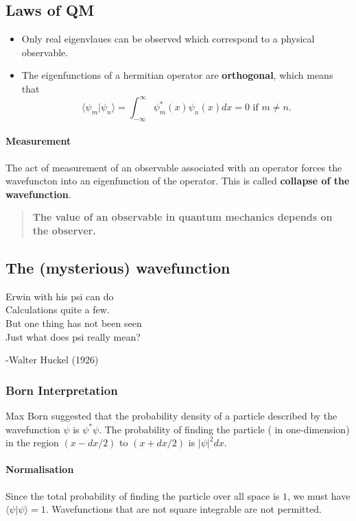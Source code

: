 \documentclass[12pt]{article}
\begin{document}
\subsection*{Laws of QM}
\begin{itemize}
\item Only real eigenvlaues can be observed which correspond to a physical observable.
\item The eigenfunctions of a hermitian operator are \textbf{orthogonal}, which means that \[\langle \psi_m | \psi_n \rangle =\int_{-\infty}^{\infty} \psi_m^*(x) \psi_n(x) dx =0 \textrm{ if } m \neq n.\]

\end{itemize}
\paragraph{Measurement} The act of measurement of an observable associated with an operator forces the wavefuncton into an eigenfunction of the operator. This is called \textbf{collapse of the wavefunction}. 
\begin{quote}
\textbf{The value of an observable in quantum mechanics depends on the observer.}
\end{quote}
\subsection*{The (mysterious) wavefunction}
\begin{center}
\sffamily
Erwin with his psi can do \\
Calculations quite a few. \\
But one thing has not been seen\\
Just what does psi really mean?\\ 
\end{center}
\begin{flushright}
\ttfamily
-Walter Huckel (1926)\\
\end{flushright}
\normalfont
\subsubsection*{Born Interpretation}
Max Born suggested that the probability density of a particle described by the wavefunction $\psi$ is $\psi^* \psi$. The probability of finding the particle ( in one-dimension) in the region $(x-dx/2)$ to $(x+dx/2)$ is $|\psi|^2 dx.$
\paragraph{Normalisation} Since the total probability of finding the particle over all space is $1$, we must have $\langle \psi | \psi \rangle =1 .$ Wavefunctions that are not square integrable are not permitted. 
\end{document}
